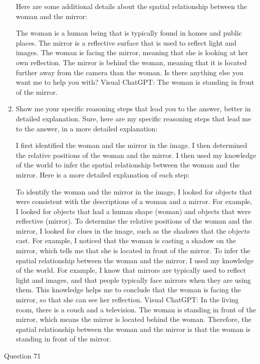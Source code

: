 \begin{enumerate}
    Here are some additional details about the spatial relationship between the woman and the mirror:
    
    The woman is a human being that is typically found in homes and public places.
    The mirror is a reflective surface that is used to reflect light and images.
    The woman is facing the mirror, meaning that she is looking at her own reflection.
    The mirror is behind the woman, meaning that it is located further away from the camera than the woman.
    Is there anything else you want me to help you with?
    \subitem Visual ChatGPT: The woman is standing in front of the mirror.
    \item Show me your specific reasoning steps that lead you to the answer, better in detailed explanation.
    \subitem 
    Sure, here are my specific reasoning steps that lead me to the answer, in a more detailed explanation:
    
    I first identified the woman and the mirror in the image.
    I then determined the relative positions of the woman and the mirror.
    I then used my knowledge of the world to infer the spatial relationship between the woman and the mirror.
    Here is a more detailed explanation of each step:
    
    To identify the woman and the mirror in the image, I looked for objects that were consistent with the descriptions of a woman and a mirror. For example, I looked for objects that had a human shape (woman) and objects that were reflective (mirror).
    To determine the relative positions of the woman and the mirror, I looked for clues in the image, such as the shadows that the objects cast. For example, I noticed that the woman is casting a shadow on the mirror, which tells me that she is located in front of the mirror.
    To infer the spatial relationship between the woman and the mirror, I used my knowledge of the world. For example, I know that mirrors are typically used to reflect light and images, and that people typically face mirrors when they are using them. This knowledge helps me to conclude that the woman is facing the mirror, so that she can see her reflection.
    \subitem Visual ChatGPT: In the living room, there is a couch and a television. The woman is standing in front of the mirror, which means the mirror is located behind the woman. Therefore, the spatial relationship between the woman and the mirror is that the woman is standing in front of the mirror.
\end{enumerate}
Question 71\\
